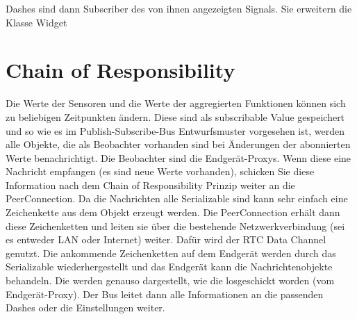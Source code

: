 \documentclass[entwurf.tex]{subfiles}
\begin{document}
Dashes sind dann Subscriber des von ihnen angezeigten Signals. Sie erweitern die Klasse Widget

\section{Chain of Responsibility}

Die Werte der Sensoren und die Werte der aggregierten Funktionen können sich zu beliebigen Zeitpunkten ändern. Diese sind als subscribable Value gespeichert und so wie es im Publish-Subscribe-Bus Entwurfsmuster vorgesehen ist, werden alle Objekte, die als Beobachter vorhanden sind bei Änderungen der abonnierten Werte benachrichtigt. Die Beobachter sind die Endgerät-Proxys. Wenn diese eine Nachricht empfangen (es sind neue Werte vorhanden), schicken Sie diese Information nach dem Chain of Responsibility Prinzip weiter an die PeerConnection. Da die Nachrichten alle Serializable sind kann sehr einfach eine Zeichenkette aus dem Objekt erzeugt werden. Die PeerConnection erhält dann diese Zeichenketten und leiten sie über die bestehende Netzwerkverbindung (sei es entweder LAN oder Internet) weiter. Dafür wird der RTC Data Channel genutzt. Die ankommende Zeichenketten auf dem Endgerät werden durch das Serializable wiederhergestellt und das Endgerät kann die Nachrichtenobjekte behandeln. Die werden genauso dargestellt, wie die losgeschickt worden (vom Endgerät-Proxy). Der Bus leitet dann alle Informationen an die passenden Dashes oder die Einstellungen weiter.
\end{document}
